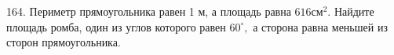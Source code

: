 164. Периметр прямоугольника равен 1 м, а площадь равна $616\text{см}^2.$ Найдите площадь ромба, один из углов которого равен $60^\circ,$ а сторона равна меньшей из сторон прямоугольника.\\
